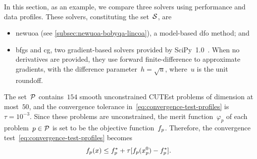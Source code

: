 In this section, as an example, we compare three solvers using performance and data profiles.
These solvers, constituting the set~$\mathcal{S}$, are
\begin{itemize}
    \item \gls{newuoa} (see \cref{subsec:newuoa-bobyqa-lincoa}), a model-based \gls{dfo} method; and
    \item \gls{bfgs} and \gls{cg}, two gradient-based solvers provided by SciPy~1.0~\cite{Virtanen_Etal_2020}.
    When no derivatives are provided, they use forward finite-difference to approximate gradients, with the difference parameter~$h = \sqrt{u}$, where~$u$ is the unit roundoff.
\end{itemize}
The set~$\mathcal{P}$ contains~$154$ smooth unconstrained CUTEst problems of dimension at most~$50$, and the convergence tolerance in~\cref{eq:convergence-test-profiles} is~$\tau = 10^{-3}$.
Since these problems are unconstrained, the merit function~$\varphi_p$ of each problem~$p \in \mathcal{P}$ is set to be the objective function~$f_p$.
Therefore, the convergence test~\cref{eq:convergence-test-profiles} becomes
\begin{equation}
    \label{eq:convergence-test-profiles-unconstrained}
    \obj_p(\iter) \le \obj_p^{\ast} + \tau [\obj_p(\iter_p^0) - \obj_p^{\ast}].
\end{equation}

